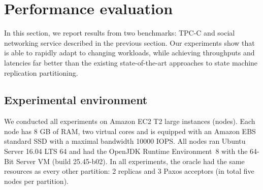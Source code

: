 \section{Performance evaluation}
\label{sec:dynastar-experiments}

In this section, we report results from two benchmarks: TPC-C and
\dynastarappname{} social networking service described in the previous section.
Our experiments show that \dynastar{} is able to rapidly adapt to changing
workloads, while achieving throughputs and latencies far better than the existing
state-of-the-art approaches to state machine replication partitioning.


\subsection{Experimental environment}
\label{sec:dynastar-evaluation:setup}

We conducted all experiments on Amazon EC2 T2 large instances (nodes). Each node has 8 GB of RAM,
two virtual cores and is equipped with an Amazon EBS standard SSD with a maximal bandwidth 10000 IOPS.
All nodes ran Ubuntu Server 16.04 LTS 64 and had the OpenJDK Runtime Environment~8 with the
\mbox{64-Bit} Server VM (build 25.45-b02). In all experiments, the oracle
had the same resources as every other partition: 2 replicas and 3 Paxos acceptors
(in total five nodes per partition).




